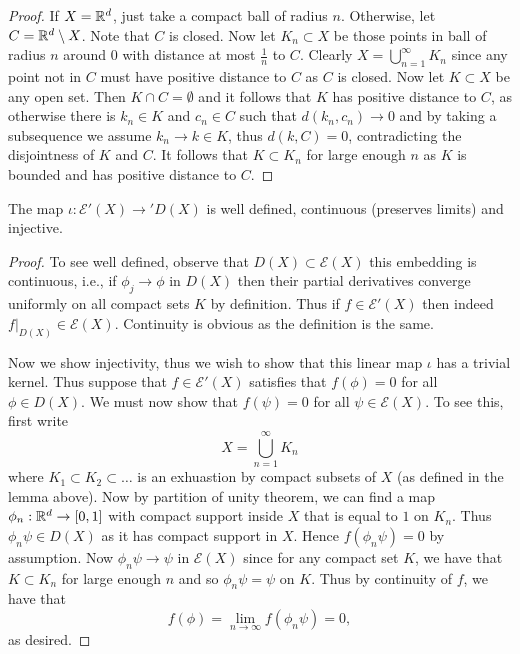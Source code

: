 \documentclass[twoside, a4paper, 10pt]{amsart}
\begin{document}
\begin{proof} If $X = \mathbb{R}^d$, just take a compact ball of radius $n$. Otherwise, let $C = \mathbb{R}^d \setminus X$. Note that $C$ is closed. Now let $K_n \subset X$ be those points in ball of radius $n$ around $0$ with distance at most $\frac{1}{n}$ to $C$. Clearly $X = \bigcup_{n=1}^{\infty} K_n$ since any point not in $C$ must have positive distance to $C$ as $C$ is closed. Now let $K \subset X$ be any open set. Then $K \cap C = \emptyset$ and it follows that $K$ has positive distance to $C$, as otherwise there is $k_n \in K$ and $c_n \in C$ such that $d(k_n, c_n) \to 0$ and by taking a subsequence we assume $k_n \to k \in K$, thus $d(k, C) = 0$, contradicting the disjointness of $K$ and $C$. It follows that $K \subset K_n$ for large enough $n$ as $K$ is bounded and has positive distance to $C$.

\end{proof}

\begin{lemma}\label{lemma: E' embeds in D'} The map $\iota:\mathcal{E}'(X) \to 'D(X)$ is well defined, continuous (preserves limits) and injective.

\end{lemma}

\begin{proof} To see well defined, observe that $D(X) \subset \mathcal{E}(X)$ this embedding is continuous, i.e., if $\phi_j \to \phi$ in $D(X)$ then their partial derivatives converge uniformly on all compact sets $K$ by definition. Thus if $f \in \mathcal{E}'(X)$ then indeed $f|_{D(X)} \in \mathcal{E}(X)$. Continuity is obvious as the definition is the same. 

Now we show injectivity, thus we wish to show that this linear map $\iota$ has a trivial kernel. Thus suppose that $f \in \mathcal{E}'(X)$ satisfies that $f(\phi) = 0$ for all $\phi \in D(X)$. We must now show that $f(\psi) = 0$ for all $\psi \in \mathcal{E}(X)$. To see this, first write $$X = \bigcup_{n=1}^{\infty} K_n$$ where $K_1 \subset K_2 \subset \ldots$ is an exhuastion by compact subsets of $X$ (as defined in the lemma above). Now by partition of unity theorem, we can find a map $\phi_n:\mathbb{R}^d \to [0,1]$ with compact support inside $X$ that is equal to $1$ on $K_n$.  Thus $\phi_n \psi \in D(X)$ as it has compact support in $X$. Hence $f(\phi_n \psi) = 0$ by assumption. Now $\phi_n\psi \to \psi$ in $\mathcal{E}(X)$ since for any compact set $K$, we have that $K \subset K_n$ for large enough $n$ and so $\phi_n\psi = \psi$ on $K$. Thus by continuity of $f$, we have that $$f(\phi) = \lim_{n \to \infty} f(\phi_n \psi) = 0,$$ as desired. \end{proof}
\end{document}
